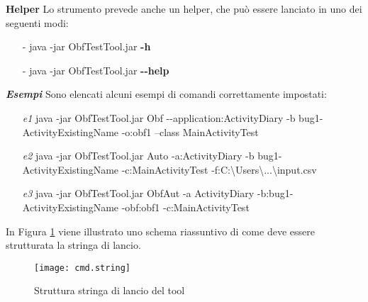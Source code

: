 \bigskip
\noindent\textbf{Helper} \newline
Lo strumento prevede anche un helper, che può essere lanciato in uno dei seguenti modi:
\begin{itemize}[nosep]
\item[-] java -jar ObfTestTool.jar \textbf{-h}
\item[-] java -jar ObfTestTool.jar \textbf{-{}-help}
\end{itemize}

\bigskip
\noindent\textbf{\emph{Esempi}} \newline
Sono elencati alcuni esempi di comandi correttamente impostati:
\begin{itemize} [nosep]
\item [\emph{e1}] 
java -jar ObfTestTool.jar Obf -{}-application:ActivityDiary -b bug1-ActivityExistingName -o:obf1 --class MainActivityTest

\item [\emph{e2}] 
 java -jar ObfTestTool.jar Auto -a:ActivityDiary -b bug1-ActivityExistingName  \newline -c:MainActivityTest -f:C:\textbackslash Users\textbackslash ...\textbackslash  input.csv

\item [\emph{e3}] 
java -jar ObfTestTool.jar ObfAut -a ActivityDiary -b:bug1-ActivityExistingName -obf:obf1 -c:MainActivityTest
\end{itemize}
\bigskip
\noindent In Figura \ref{fig:cmd.string} viene illustrato uno schema riassuntivo di come deve essere strutturata la stringa di lancio.
\begin{figure}[H]
	\texttt{[image: cmd.string]}
	\centering
	\caption{Struttura  stringa di lancio del tool}
    \label{fig:cmd.string}
\end{figure}
